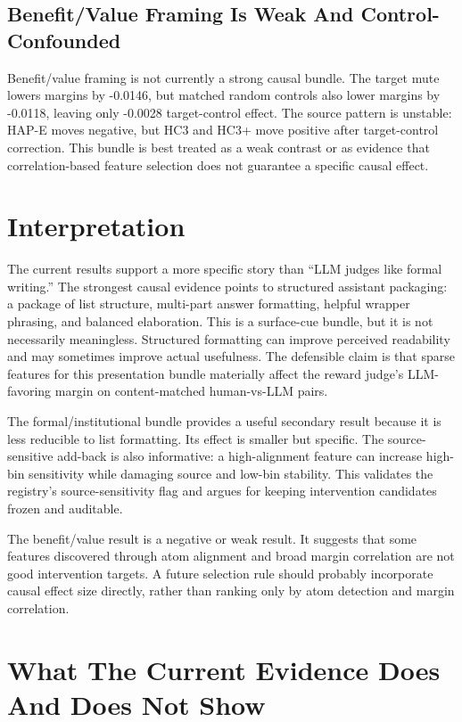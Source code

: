 \documentclass[11pt]{article}
\begin{document}
\subsection{Benefit/Value Framing Is Weak And Control-Confounded}

Benefit/value framing is not currently a strong causal bundle. The target mute
lowers margins by -0.0146, but matched random controls also lower margins by
-0.0118, leaving only -0.0028 target-control effect. The source pattern is
unstable: HAP-E moves negative, but HC3 and HC3+ move positive after
target-control correction. This bundle is best treated as a weak contrast or
as evidence that correlation-based feature selection does not guarantee a
specific causal effect.

\section{Interpretation}

The current results support a more specific story than ``LLM judges like
formal writing.'' The strongest causal evidence points to structured assistant
packaging: a package of list structure, multi-part answer formatting, helpful
wrapper phrasing, and balanced elaboration. This is a surface-cue bundle, but
it is not necessarily meaningless. Structured formatting can improve perceived
readability and may sometimes improve actual usefulness. The defensible claim
is that sparse features for this presentation bundle materially affect the
reward judge's LLM-favoring margin on content-matched human-vs-LLM pairs.

The formal/institutional bundle provides a useful secondary result because it
is less reducible to list formatting. Its effect is smaller but specific. The
source-sensitive add-back is also informative: a high-alignment feature can
increase high-bin sensitivity while damaging source and low-bin stability. This
validates the registry's source-sensitivity flag and argues for keeping
intervention candidates frozen and auditable.

The benefit/value result is a negative or weak result. It suggests that some
features discovered through atom alignment and broad margin correlation are not
good intervention targets. A future selection rule should probably incorporate
causal effect size directly, rather than ranking only by atom detection and
margin correlation.

\section{What The Current Evidence Does And Does Not Show}
\end{document}
